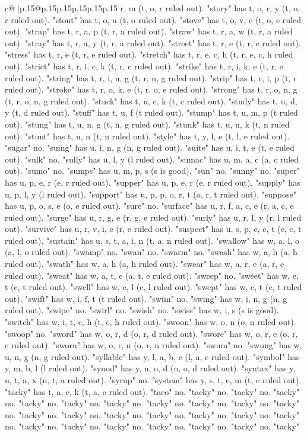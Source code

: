 \documentclass{article}
\begin{document}
{\begin{supertabular}{c@{$\;$}|p{.15\linewidth}@{}p{.15\linewidth}p{.15\linewidth}p{.15\linewidth}p{.15\linewidth}p{.15\linewidth}}
{{{r, m (t, o, r ruled out). "story" has t, o, r, y (t, o, r ruled out). "stout" has t, o, u (t, o ruled out). "stove" has t, o, v, e (t, o, e ruled out). "strap" has t, r, a, p (t, r, a ruled out). "straw" has t, r, a, w (t, r, a ruled out). "stray" has t, r, a, y (t, r, a ruled out). "street" has t, r, e (t, r, e ruled out). "stress" has t, r, e (t, r, e ruled out). "stretch" has t, r, e, c, h (t, r, e, c, h ruled out). "strict" has t, r, i, c, k (t, r, c ruled out). "strike" has t, r, i, k, e (t, r, e ruled out). "string" has t, r, i, n, g (t, r, n, g ruled out). "strip" has t, r, i, p (t, r ruled out). "stroke" has t, r, o, k, e (t, r, o, e ruled out). "strong" has t, r, o, n, g (t, r, o, n, g ruled out). "stuck" has t, u, c, k (t, c ruled out). "study" has t, u, d, y (t, d ruled out). "stuff" has t, u, f (t ruled out). "stump" has t, u, m, p (t ruled out). "stung" has t, u, n, g (t, n, g ruled out). "stunk" has t, u, n, k (t, n ruled out). "stunt" has t, u, n (t, n ruled out). "style" has t, y, l, e (t, l, e ruled out). "sugar" no. "suing" has u, i, n, g (n, g ruled out). "suite" has u, i, t, e (t, e ruled out). "sulk" no. "sully" has u, l, y (l ruled out). "sumac" has u, m, a, c (a, c ruled out). "sumo" no. "sumps" has u, m, p, s (s is good). "sun" no. "sunny" no. "super" has u, p, e, r (e, r ruled out). "supper" has u, p, e, r (e, r ruled out). "supply" has u, p, l, y (l ruled out). "support" has u, p, p, o, r, t (o, r, t ruled out). "suppose" has u, p, o, s, e (o, e ruled out). "sure" no. "surface" has u, r, f, a, c, e (r, a, c, e ruled out). "surge" has u, r, g, e (r, g, e ruled out). "surly" has u, r, l, y (r, l ruled out). "survive" has u, r, v, i, e (r, e ruled out). "suspect" has u, s, p, e, c, t (e, c, t ruled out). "sustain" has u, s, t, a, i, n (t, a, n ruled out). "swallow" has w, a, l, o (a, l, o ruled out). "swamp" no. "swan" no. "swarm" no. "swash" has w, a, h (a, h ruled out). "swath" has w, a, h (a, h ruled out). "swear" has w, a, r, e (a, r, e ruled out). "sweat" has w, a, t, e (a, t, e ruled out). "sweep" no. "sweet" has w, e, t (e, t ruled out). "swell" has w, e, l (e, l ruled out). "swept" has w, e, t (e, t ruled out). "swift" has w, i, f, t (t ruled out). "swim" no. "swing" has w, i, n, g (n, g ruled out). "swipe" no. "swirl" no. "swish" no. "swiss" has w, i, s (s is good). "switch" has w, i, t, c, h (t, c, h ruled out). "swoon" has w, o, n (o, n ruled out). "swoop" no. "sword" has w, o, r, d (o, r, d ruled out). "swore" has w, o, r, e (o, r, e ruled out). "sworn" has w, o, r, n (o, r, n ruled out). "swum" no. "swung" has w, u, n, g (n, g ruled out). "syllable" has y, l, a, b, e (l, a, e ruled out). "symbol" has y, m, b, l (l ruled out). "synod" has y, n, o, d (n, o, d ruled out). "syntax" has y, n, t, a, x (n, t, a ruled out). "syrup" no. "system" has y, s, t, e, m (t, e ruled out). "tacky" has t, a, c, k (t, a, c ruled out). "taco" no. "tacky" no. "tacky" no. "tacky" no. "tacky" no. "tacky" no. "tacky" no. "tacky" no. "tacky" no. "tacky" no. "tacky" no. "tacky" no. "tacky" no. "tacky" no. "tacky" no. "tacky" no. "tacky" no. "tacky" no. "tacky" no. "tacky" no. "tacky" no. "tacky" no. "tacky" no. "tacky" no. "tacky" }}}
\end{supertabular}}
\end{document}
